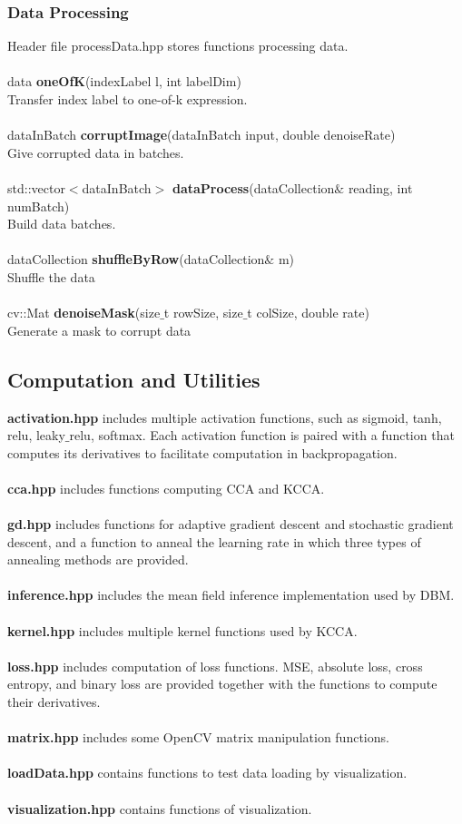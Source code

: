 \documentclass[12pt]{article}
\begin{document}
\subsubsection{Data Processing}
Header file processData.hpp stores functions processing data.\\
\\
data \textbf{oneOfK}(indexLabel l, int labelDim)\\
Transfer index label to one-of-k expression.\\
\\
dataInBatch \textbf{corruptImage}(dataInBatch input, double denoiseRate)\\
Give corrupted data in batches.\\
\\
std::vector$<$dataInBatch$>$ \textbf{dataProcess}(dataCollection$\&$ reading, int numBatch)\\
Build data batches.\\
\\
dataCollection \textbf{shuffleByRow}(dataCollection$\&$ m)\\
Shuffle the data\\
\\
cv::Mat \textbf{denoiseMask}(size$\_$t rowSize, size$\_$t colSize, double rate)\\
Generate a mask to corrupt data
\subsection{Computation and Utilities}
\textbf{activation.hpp} includes multiple activation functions, such as sigmoid, tanh, relu, leaky$\_$relu, softmax. Each activation function is paired with a function that computes its derivatives to facilitate computation in backpropagation.\\
\\
\textbf{cca.hpp} includes functions computing CCA and KCCA.\\
\\
\textbf{gd.hpp} includes functions for adaptive gradient descent and stochastic gradient descent, and a function to anneal the learning rate in which three types of annealing methods are provided.\\
\\
\textbf{inference.hpp} includes the mean field inference implementation used by DBM.\\
\\
\textbf{kernel.hpp} includes multiple kernel functions used by KCCA.\\
\\
\textbf{loss.hpp} includes computation of loss functions. MSE, absolute loss, cross entropy, and binary loss are provided together with the functions to compute their derivatives.\\
\\
\textbf{matrix.hpp} includes some OpenCV matrix manipulation functions.\\
\\
\textbf{loadData.hpp} contains functions to test data loading by visualization.\\
\\
\textbf{visualization.hpp} contains functions of visualization.\\
\end{document}
